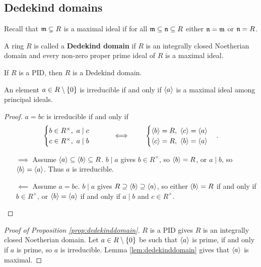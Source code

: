 \subsection{Dedekind domains}

Recall that $ \mathfrak{m} \subsetneq R $ is a maximal ideal if for all $ \mathfrak{m} \subseteq \mathfrak{n} \subseteq R $ either $ \mathfrak{n} = \mathfrak{m} $ or $ \mathfrak{n} = R $.

\begin{definition}
A ring $ R $ is called a \textbf{Dedekind domain} if $ R $ is an integrally closed Noetherian domain and every non-zero proper prime ideal of $ R $ is a maximal ideal.
\end{definition}

\begin{proposition}
\label{prop:dedekinddomain}
If $ R $ is a PID, then $ R $ is a Dedekind domain.
\end{proposition}

\begin{lemma}
\label{lem:dedekinddomain}
An element $ a \in R \setminus \left\{ 0 \right\} $ is irreducible if and only if $ \left\langle a \right\rangle $ is a maximal ideal among principal ideals.
\end{lemma}

\begin{proof}
$ a = bc $ is irreducible if and only if
$$
\begin{cases}
b \in R^\times, \ a \mid c \\
c \in R^\times, \ a \mid b
\end{cases}
\qquad \iff \qquad
\begin{cases}
\left\langle b \right\rangle = R, \ \left\langle c \right\rangle = \left\langle a \right\rangle \\
\left\langle c \right\rangle = R, \ \left\langle b \right\rangle = \left\langle a \right\rangle
\end{cases}.
$$
\begin{itemize}
\item[$ \implies $] Assume $ \left\langle a \right\rangle \subseteq \left\langle b \right\rangle \subseteq R $. $ b \mid a $ gives $ b \in R^\times $, so $ \left\langle b \right\rangle = R $, or $ a \mid b $, so $ \left\langle b \right\rangle = \left\langle a \right\rangle $. Thus $ a $ is irreducible.
\item[$ \impliedby $] Assume $ a = bc $. $ b \mid a $ gives $ R \supseteq \left\langle b \right\rangle \supseteq \left\langle a \right\rangle $, so either $ \left\langle b \right\rangle = R $ if and only if $ b \in R^\times $, or $ \left\langle b \right\rangle = \left\langle a \right\rangle $ if and only if $ a \mid b $ and $ c \in R^\times $.
\end{itemize}
\end{proof}

\begin{proof}[Proof of Proposition \ref{prop:dedekinddomain}]
$ R $ is a PID gives $ R $ is an integrally closed Noetherian domain. Let $ a \in R \setminus \left\{ 0 \right\} $ be such that $ \left\langle a \right\rangle $ is prime, if and only if $ a $ is prime, so $ a $ is irreducible. Lemma \ref{lem:dedekinddomain} gives that $ \left\langle a \right\rangle $ is maximal.
\end{proof}


